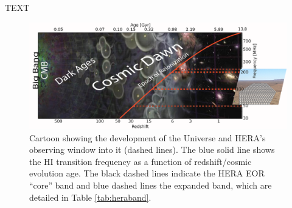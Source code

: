 \documentclass[ars]{copernicus}
\def\HI{{H{\small I }}}
\begin{document}
\begin{acknowledgements}
TEXT
\end{acknowledgements}





%
%
%
%




\begin{figure}[ht]
\vspace*{2mm}
\begin{center}
\includegraphics[width=\textwidth]{plots/herauniall.png}
\end{center}
\caption{\small Cartoon showing the development of the Universe and HERA's observing window into it (dashed lines).  The blue solid
line shows the \HI transition frequency as a function of redshift/cosmic evolution age.  The black dashed lines indicate the HERA EOR ``core'' band and blue dashed lines the expanded band, which are detailed in Table \ref{tab:heraband}.}
\label{fig:theUniverse}
\end{figure}
\end{document}
